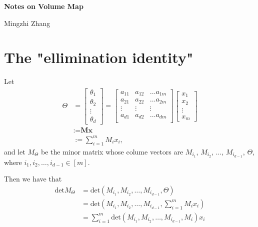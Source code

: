 \documentclass[12pt]{article}
\theoremstyle{definition}
\numberwithin{equation}{subsection}
\begin{document}
\begin{center}
{\Large\bf 
Notes on Volume Map
}\\ [7pt]
\end{center}

\vskip 3mm

\begin{center}
Mingzhi Zhang
\end{center}

\vskip 3mm

\section{The "ellimination identity"}
Let 
\begin{align*}
    \Theta &=
\begin{bmatrix}
  \theta_1 \\
  \theta_2 \\
  \vdots \\
  \theta_d
\end{bmatrix} 
=
\begin{bmatrix}
  a_{11} & a_{12} & \ldots a_{1m} \\
  a_{21} & a_{22} & \ldots a_{2m} \\
  \vdots & \vdots & \vdots \\
  a_{d1} & a_{d2} & \ldots a_{dm} \\
\end{bmatrix} 
\begin{bmatrix}
  x_1 \\
  x_2 \\
  \vdots \\
  x_m
\end{bmatrix} \\
&:= \textbf{Mx} \\
&:=\sum_{i = 1}^{m} M_i x_i,
\end{align*}
\newline
and let $M_{\Theta}$ be the minor matrix whose colume vectors are $M_{i_1}$, $M_{i_2}$, $\ldots$, $M_{i_{d-1}}$, $\Theta$, where $i_1, i_2, \ldots, i_{d-1} \in [m]$.

Then we have that 
\begin{align*}
    \text{det}M_{\Theta} &= \text{det}(M_{i_{1}}, M_{i_{2}}, \ldots, M_{i_{d-1}}, \Theta) \\
    &= \text{det}(M_{i_{1}}, M_{i_{2}}, \ldots, M_{i_{d-1}}, \sum_{i = 1}^{m} M_i x_i) \\
    &= \sum_{i = 1}^{m} \text{det}(M_{i_{1}}, M_{i_{2}}, \ldots, M_{i_{d-1}}, M_i)  x_i
\end{align*}
\end{document}
